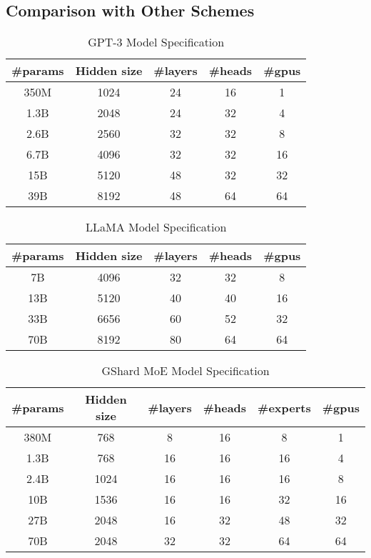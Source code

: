 \subsection{Comparison with Other Schemes}\label{sec:exp:comparison}

\begin{table}[h!]
\centering
\caption{GPT-3 Model Specification}
\label{tab:gpt-3}
\begin{tabular}{ccccc}
\hline
\#params & Hidden size & \#layers & \#heads & \#gpus \\ \hline\hline
350M & 1024 & 24 & 16 & 1 \\ 
1.3B & 2048 & 24 & 32 & 4 \\ 
2.6B & 2560 & 32 & 32 & 8 \\ 
6.7B & 4096 & 32 & 32 & 16 \\ 
15B & 5120 & 48 & 32 & 32 \\ 
39B & 8192 & 48 & 64 & 64 \\ \hline\hline
\end{tabular}
\end{table}


\begin{table}[h!]
\centering
\caption{LLaMA Model Specification}
\label{tab:llama}
\begin{tabular}{ccccc}
\hline
\#params & Hidden size & \#layers & \#heads & \#gpus \\ \hline\hline
7B & 4096 & 32 & 32 & 8 \\
13B & 5120 & 40 & 40 & 16 \\
33B & 6656 & 60 & 52 & 32 \\
70B & 8192 & 80 & 64 & 64 \\ \hline\hline
\end{tabular}
\end{table}

\begin{table}[h!]
\centering
\caption{GShard MoE Model Specification}
\label{tab:moe}
\begin{tabular}{cccccc}
\hline
\#params & Hidden size & \#layers & \#heads & \#experts & \#gpus \\ \hline\hline
380M & 768 & 8 & 16 & 8 & 1 \\
1.3B & 768 & 16 & 16 & 16 & 4 \\
2.4B & 1024 & 16 & 16 & 16 & 8 \\
10B & 1536 & 16 & 16 & 32 & 16 \\
27B & 2048 & 16 & 32 & 48 & 32 \\
70B & 2048 & 32 & 32 & 64 & 64 \\ \hline\hline
\end{tabular}
\end{table}

